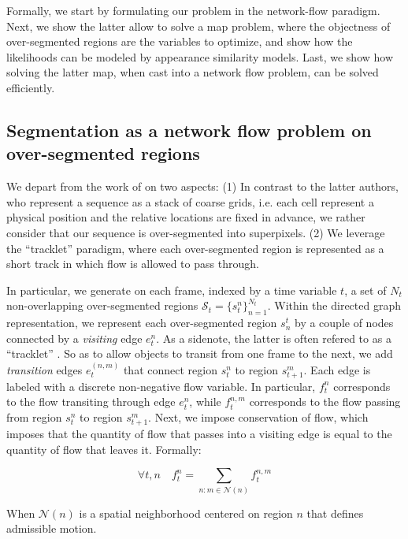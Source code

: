 Formally, we start by formulating our problem in the network-flow paradigm.
Next, we show the latter allow to solve a \gls{map} problem, where the objectness of over-segmented regions are the variables to optimize, and show how the likelihoods can be modeled by appearance similarity models.
Last, we show how solving the latter \gls{map}, when cast into a network flow problem, can be solved efficiently.

\subsection{Segmentation as a network flow problem on over-segmented regions}
We depart from the work of \cite{berclaz11} on two aspects: (1) In contrast to the latter authors, who represent a sequence as a stack of coarse grids, i.e. each cell represent a physical position and the relative locations are fixed in advance, we rather consider that our sequence is over-segmented into superpixels.
(2) We leverage the ``tracklet'' paradigm, where each over-segmented region is represented as a short track in which flow is allowed to pass through.


In particular, we generate on each frame, indexed by a time variable $t$, a set of $N_{t}$ non-overlapping over-segmented regions $\mathcal{S}_{t}=\{s_{t}^{n}\}_{n=1}^{N_{t}}$.
Within the directed graph representation, we represent each over-segmented region $s^{t}_{n}$ by a couple of nodes connected by a \textit{visiting} edge $e^{n}_{t}$.
As a sidenote, the latter is often refered to as a ``tracklet'' \cite{zhang08}.
So as to allow objects to transit from one frame to the next, we add \textit{transition} edges $e^{(n,m)}_{t}$ that connect region $s^{n}_{t}$ to region $s^{m}_{t+1}$.
Each edge is labeled with a discrete non-negative flow variable.
In particular, $f_{t}^{n}$ corresponds to the flow transiting through edge $e_{t}^{n}$, while $f_{t}^{n,m}$ corresponds to the flow passing from region $s_{t}^{n}$ to region $s_{t+1}^{m}$.
Next, we impose conservation of flow, which imposes that the quantity of flow that passes into a visiting edge is equal to the quantity of flow that leaves it. Formally:

\begin{equation}
  \label{eq:flow_conserv}
  \forall t,n \quad f_{t}^{n} = \sum_{n:m\in \mathcal{N}(n)}f_{t}^{n,m}
\end{equation}

When $\mathcal{N}(n)$ is a spatial neighborhood centered on region $n$ that defines admissible motion.

